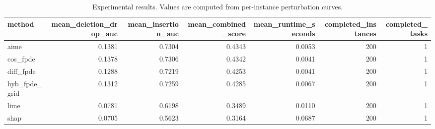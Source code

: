 \begin{table}[t]
\caption{Experimental results. Values are computed from per-instance perturbation curves.}
\label{tab:main_results_computed}
\centering
\begin{tabular}{lrrrrrr}
\toprule
method & mean\_deletion\_drop\_auc & mean\_insertion\_auc & mean\_combined\_score & mean\_runtime\_seconds & completed\_instances & completed\_tasks \\
\midrule
aime & 0.1381 & 0.7304 & 0.4343 & 0.0053 & 200 & 1 \\
cos\_fpde & 0.1378 & 0.7306 & 0.4342 & 0.0041 & 200 & 1 \\
diff\_fpde & 0.1288 & 0.7219 & 0.4253 & 0.0041 & 200 & 1 \\
hyb\_fpde\_grid & 0.1312 & 0.7259 & 0.4285 & 0.0067 & 200 & 1 \\
lime & 0.0781 & 0.6198 & 0.3489 & 0.0110 & 200 & 1 \\
shap & 0.0705 & 0.5623 & 0.3164 & 0.0687 & 200 & 1 \\
\bottomrule
\end{tabular}

\end{table}
